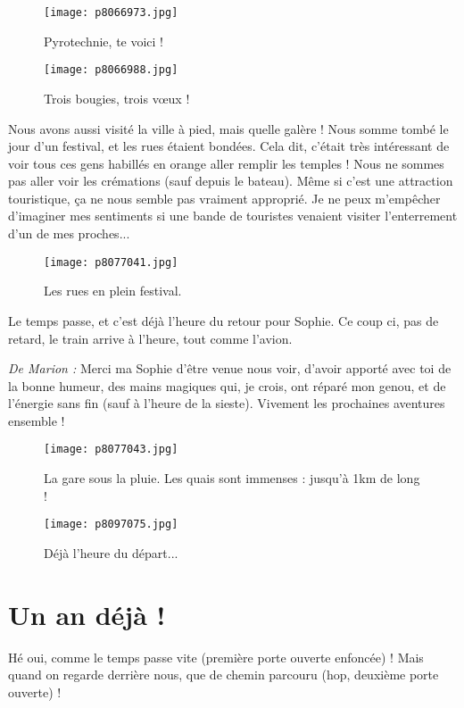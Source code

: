 \documentclass{book}
\begin{document}
\begin{figure}[h]
\centering
\texttt{[image: p8066973.jpg]}
\caption*{Pyrotechnie, te voici !}
\end{figure}


\begin{figure}[h]
\centering
\texttt{[image: p8066988.jpg]}
\caption*{Trois bougies, trois vœux !}
\end{figure}

Nous avons aussi visité la ville à pied, mais quelle galère ! Nous somme tombé le jour d'un festival, et les rues étaient bondées. Cela dit, c'était très intéressant de voir tous ces gens habillés en orange aller remplir les temples ! Nous ne sommes pas aller voir les crémations (sauf depuis le bateau). Même si c'est une attraction touristique, ça ne nous semble pas vraiment approprié. Je ne peux m'empêcher d'imaginer mes sentiments si une bande de touristes venaient visiter l'enterrement d'un de mes proches...


\begin{figure}[h]
\centering
\texttt{[image: p8077041.jpg]}
\caption*{Les rues en plein festival.}
\end{figure}

Le temps passe, et c'est déjà l'heure du retour pour Sophie. Ce coup ci, pas de retard, le train arrive à l'heure, tout comme l'avion.

\emph{De Marion :} Merci ma Sophie d'être venue nous voir, d'avoir apporté avec toi de la bonne humeur, des mains magiques qui, je crois, ont réparé mon genou, et de l'énergie sans fin (sauf à l'heure de la sieste). Vivement les prochaines aventures ensemble !


\begin{figure}[h]
\centering
\texttt{[image: p8077043.jpg]}
\caption*{La gare sous la pluie. Les quais sont immenses : jusqu'à 1km de long !}
\end{figure}


\begin{figure}[h]
\centering
\texttt{[image: p8097075.jpg]}
\caption*{Déjà l'heure du départ...}
\end{figure}



\chapter{Un an déjà !}
Hé oui, comme le temps passe vite (première porte ouverte enfoncée) ! Mais quand on regarde derrière nous, que de chemin parcouru (hop, deuxième porte ouverte) !
\end{document}

